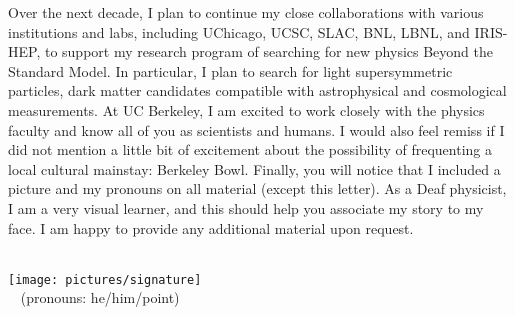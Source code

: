 \documentclass[10pt,letterpaper,sans]{moderncv} %
\makeatletter
\renewcommand*{\makeletterclosing}{
  \@closing\\[0.5em]%
  \texttt{[image: pictures/signature]}\\%
  {\bfseries \@firstname~\@lastname} (pronouns: he/him/point)%
  \ifthenelse{\isundefined{\@enclosure}}{}{%
    \\%
    \vfill%
    {\color{color2}\itshape\enclname: \@enclosure}}}
\makeatother
\begin{document}
Over the next decade, I plan to continue my close collaborations with various institutions and labs, including UChicago, UCSC, SLAC, BNL, LBNL, and IRIS-HEP, to support my research program of searching for new physics Beyond the Standard Model. In particular, I plan to search for light supersymmetric particles, dark matter candidates compatible with astrophysical and cosmological measurements. At UC Berkeley, I am excited to work closely with the physics faculty and know all of you as scientists and humans. I would also feel remiss if I did not mention a little bit of excitement about the possibility of frequenting a local cultural mainstay: Berkeley Bowl. Finally, you will notice that I included a picture and my pronouns on all material (except this letter). As a Deaf physicist, I am a very visual learner, and this should help you associate my story to my face. I am happy to provide any additional material upon request.

\makeletterclosing
\end{document}
